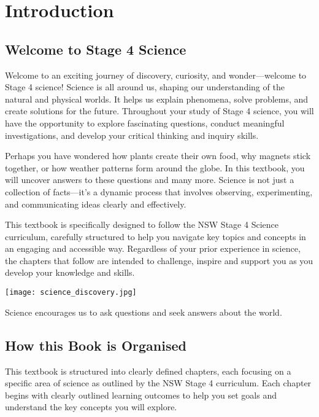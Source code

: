 \chapter{Introduction}

\section{Welcome to Stage 4 Science}

Welcome to an exciting journey of discovery, curiosity, and wonder—welcome to Stage 4 science! Science is all around us, shaping our understanding of the natural and physical worlds. It helps us explain phenomena, solve problems, and create solutions for the future. Throughout your study of Stage 4 science, you will have the opportunity to explore fascinating questions, conduct meaningful investigations, and develop your critical thinking and inquiry skills.

Perhaps you have wondered how plants create their own food, why magnets stick together, or how weather patterns form around the globe. In this textbook, you will uncover answers to these questions and many more. Science is not just a collection of facts—it's a dynamic process that involves observing, experimenting, and communicating ideas clearly and effectively.

This textbook is specifically designed to follow the NSW Stage 4 Science curriculum, carefully structured to help you navigate key topics and concepts in an engaging and accessible way. Regardless of your prior experience in science, the chapters that follow are intended to challenge, inspire and support you as you develop your knowledge and skills.

\begin{marginfigure}[0pt]
    \texttt{[image: science\_discovery.jpg]}
    \caption{Science encourages us to ask questions and seek answers about the world.}
\end{marginfigure}

\FloatBarrier

\section{How this Book is Organised}

This textbook is structured into clearly defined chapters, each focusing on a specific area of science as outlined by the NSW Stage 4 curriculum. Each chapter begins with clearly outlined learning outcomes to help you set goals and understand the key concepts you will explore.

